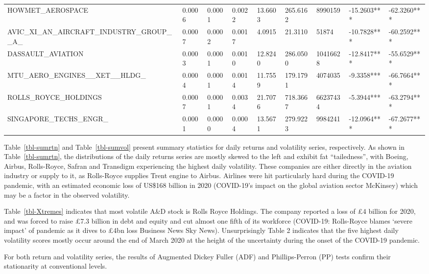 \documentclass[
  number]{elsarticle}
\begin{document}
\begin{table}[H]
{\begin{tabular}[t]{lllllllll}
\addlinespace
HOWMET\_AEROSPACE & 0.0006 & 0.0001 & 0.0022 & 13.6603 & 265.6162 & 8990159 & -15.2603*** & -62.3260***\\
AVIC\_XI\_AN\_AIRCRAFT\_INDUSTRY\_GROUP\_\_A\_ & 0.0007 & 0.0002 & 0.0017 & 4.0915 & 21.3110 & 51874 & -10.7828*** & -60.2592***\\
DASSAULT\_AVIATION & 0.0003 & 0.0001 & 0.0010 & 12.8240 & 286.0500 & 10416628 & -12.8417*** & -55.6529***\\
MTU\_AERO\_ENGINES\_\_XET\_\_HLDG\_ & 0.0004 & 0.0001 & 0.0014 & 11.7559 & 179.1791 & 4074035 & -9.3358*** & -66.7664***\\
ROLLS\_ROYCE\_HOLDINGS & 0.0007 & 0.0001 & 0.0034 & 21.7076 & 718.3667 & 66237434 & -5.3944*** & -63.2794***\\
\addlinespace
SINGAPORE\_TECHS\_ENGR\_ & 0.0001 & 0.0000 & 0.0004 & 13.5671 & 279.9223 & 9984241 & -12.0964*** & -67.2677***\\
\bottomrule
\end{tabular}}
\end{table}

Table~\ref{tbl-sumrtn} and Table~\ref{tbl-sumvol} present summary
statistics for daily returns and volatility series, respectively. As
shown in Table~\ref{tbl-sumrtn}, the distributions of the daily returns
series are mostly skewed to the left and exhibit fat ``tailedness'',
with Boeing, Airbus, Rolls-Royce, Safran and Transdigm experiencing the
highest daily volatility. These companies are either directly in the
aviation industry or supply to it, as Rolls-Royce supplies Trent engine
to Airbus. Airlines were hit particularly hard during the COVID-19
pandemic, with an estimated economic loss of US\$168 billion in 2020
(COVID-19's impact on the global aviation sector \textbar{} McKinsey)
which may be a factor in the observed volatility.

Table~\ref{tbl-Xtremes} indicates that most volatile A\&D stock is Rolls
Royce Holdings. The company reported a loss of £4 billion for 2020, and
was forced to raise £7.3 billion in debt and equity and cut almost one
fifth of its workforce (COVID-19: Rolls-Royce blames `severe impact' of
pandemic as it dives to £4bn loss \textbar{} Business News \textbar{}
Sky News). Unsurprisingly Table 2 indicates that the five highest daily
volatility scores mostly occur around the end of March 2020 at the
height of the uncertainty during the onset of the COVID-19 pandemic.

For both return and volatility series, the results of Augmented Dickey
Fuller (ADF) and Phillips-Perron (PP) tests confirm their stationarity
at conventional levels.
\end{document}
